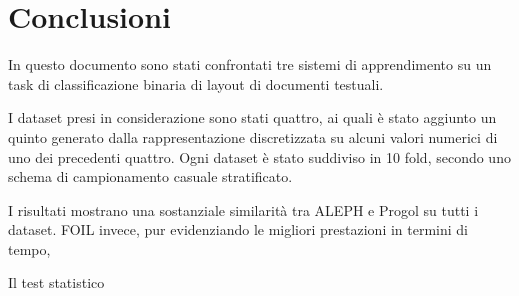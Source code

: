 \section{Conclusioni}

In questo documento sono stati confrontati tre sistemi di apprendimento su un task di classificazione binaria di layout di documenti testuali.

I dataset presi in considerazione sono stati quattro, ai quali è stato aggiunto un quinto generato dalla rappresentazione discretizzata su alcuni valori numerici di uno dei precedenti quattro. Ogni dataset è stato suddiviso in 10 fold, secondo uno schema di campionamento casuale stratificato.

I risultati mostrano una sostanziale similarità tra ALEPH e Progol su tutti i dataset. 
FOIL invece, pur evidenziando le migliori prestazioni in termini di tempo, 

Il test statistico